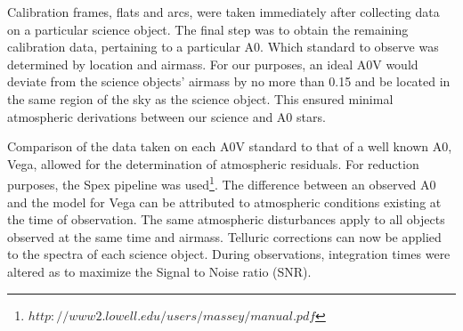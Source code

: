 Calibration frames, flats and arcs, were taken immediately after collecting data on a particular science object.  The final step was to obtain the remaining calibration data, pertaining to a particular A0.  Which standard to observe was determined by location and airmass.  For our purposes, an ideal A0V would deviate from the science objects' airmass by no more than 0.15 and be located in the same region of the sky as the science object.  This ensured minimal atmospheric derivations between our science and A0 stars.



Comparison of the data taken on each A0V standard to that of a well known A0, Vega, allowed for the determination of atmospheric residuals.  %
For reduction purposes, the Spex pipeline was used\footnote{$http://www2.lowell.edu/users/massey/manual.pdf$}.  The difference between an observed A0 and the model for Vega can be attributed to atmospheric conditions existing at the time of observation.  The same atmospheric disturbances apply to all objects observed at the same time and airmass.  Telluric corrections can now be applied to the spectra of each science object.  During observations, integration times were altered as to maximize the Signal to Noise ratio (SNR). \cite{Cushing_2004}\\